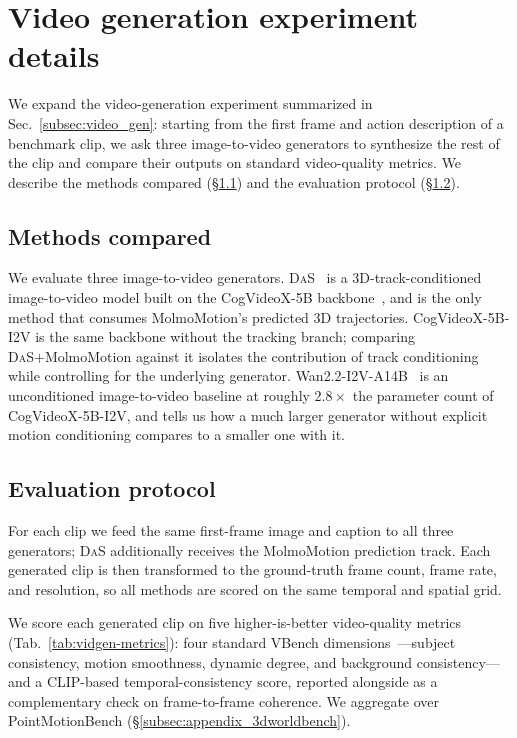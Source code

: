 \documentclass{llmxive}
\providecommand{\modelname}{MolmoMotion\xspace}
\providecommand{\benchmarkname}{PointMotionBench\xspace}
\begin{document}
\section{Video generation experiment details}
\label{appsec:vidgen}

We expand the video-generation experiment summarized in Sec.~\ref{subsec:video_gen}: starting from the first frame and action description of a benchmark clip, we ask three image-to-video generators to synthesize the rest of the clip and compare their outputs on standard video-quality metrics. We describe the methods compared (\S\ref{appsec:vidgen_methods}) and the evaluation protocol (\S\ref{appsec:vidgen_eval}).

\subsection{Methods compared}
\label{appsec:vidgen_methods}

We evaluate three image-to-video generators. \textsc{DaS}~\cite{gu2025diffusionasshader} is a 3D-track-conditioned image-to-video model built on the CogVideoX-5B backbone~\cite{yang2025cogvideoxtexttovideodiffusionmodels}, and is the only method that consumes \modelname's predicted 3D trajectories. CogVideoX-5B-I2V is the same backbone without the tracking branch; comparing \textsc{DaS}+\modelname against it isolates the contribution of track conditioning while controlling for the underlying generator. Wan2.2-I2V-A14B~\cite{wan22} is an unconditioned image-to-video baseline at roughly $2.8\times$ the parameter count of CogVideoX-5B-I2V, and tells us how a much larger generator without explicit motion conditioning compares to a smaller one with it.


\subsection{Evaluation protocol}
\label{appsec:vidgen_eval}

For each clip we feed the same first-frame image and caption to all three generators; \textsc{DaS} additionally receives the MolmoMotion prediction track. Each generated clip is then transformed to the ground-truth frame count, frame rate, and resolution, so all methods are scored on the same temporal and spatial grid.

We score each generated clip on five higher-is-better video-quality metrics (Tab.~\ref{tab:vidgen-metrics}): four standard VBench dimensions~\cite{huang2023vbench}---subject consistency, motion smoothness, dynamic degree, and background consistency---and a CLIP-based temporal-consistency score, reported alongside as a complementary check on frame-to-frame coherence. We aggregate over \benchmarkname{} (\S\ref{subsec:appendix_3dworldbench}).
\end{document}
